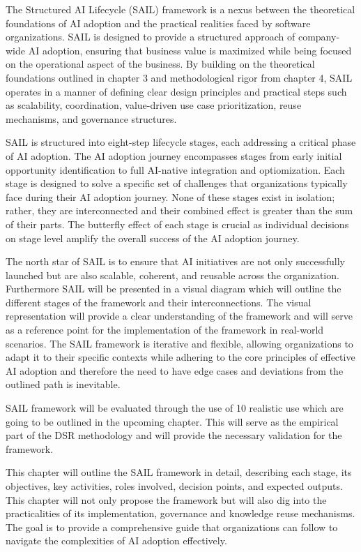 \documentclass[]{imc-inf}
\begin{document}
The Structured AI Lifecycle (SAIL) framework is a nexus between the
theoretical foundations of AI adoption and the practical realities faced
by software organizations. SAIL is designed to provide a structured
approach of company-wide AI adoption, ensuring that business value is
maximized while being focused on the operational aspect of the business.
By building on the theoretical foundations outlined in chapter 3 and
methodological rigor from chapter 4, SAIL operates in a manner of
defining clear design principles and practical steps such as
scalability, coordination, value-driven use case prioritization, reuse
mechanisms, and governance structures.

SAIL is structured into eight-step lifecycle stages, each addressing a
critical phase of AI adoption. The AI adoption journey encompasses
stages from early initial opportunity identification to full AI-native
integration and optiomization. Each stage is designed to solve a
specific set of challenges that organizations typically face during
their AI adoption journey. None of these stages exist in isolation;
rather, they are interconnected and their combined effect is greater
than the sum of their parts. The butterfly effect of each stage is
crucial as individual decisions on stage level amplify the overall
success of the AI adoption journey.

The north star of SAIL is to ensure that AI initiatives are not only
successfully launched but are also scalable, coherent, and reusable
across the organization. Furthermore SAIL will be presented in a visual
diagram which will outline the different stages of the framework and
their interconnections. The visual representation will provide a clear
understanding of the framework and will serve as a reference point for
the implementation of the framework in real-world scenarios. The SAIL
framework is iterative and flexible, allowing organizations to adapt it
to their specific contexts while adhering to the core principles of
effective AI adoption and therefore the need to have edge cases and
deviations from the outlined path is inevitable.

SAIL framework will be evaluated through the use of 10 realistic use
which are going to be outlined in the upcoming chapter. This will serve
as the empirical part of the DSR methodology and will provide the
necessary validation for the framework.

This chapter will outline the SAIL framework in detail, describing each
stage, its objectives, key activities, roles involved, decision points,
and expected outputs. This chapter will not only propose the framework
but will also dig into the practicalities of its implementation,
governance and knowledge reuse mechanisms. The goal is to provide a
comprehensive guide that organizations can follow to navigate the
complexities of AI adoption effectively.
\end{document}
